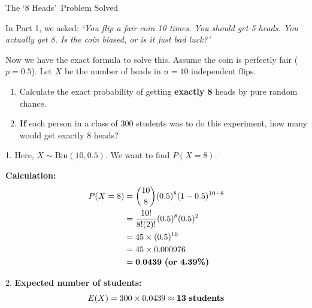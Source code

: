 \begin{frame}[allowframebreaks]{The \lq 8 Heads\rq\ Problem Solved}
    \begin{example}
        In Part 1, we asked: \textit{\lq You flip a fair coin 10 times. You should get 5 heads. You actually get 8. Is the coin biased, or is it just bad luck?\rq}
        
        Now we have the exact formula to solve this. Assume the coin is perfectly fair ($p = 0.5$). Let $X$ be the number of heads in $n=10$ independent flips.
        
        \vspace{0.2cm}
        \begin{enumerate}
            \item Calculate the exact probability of getting \textbf{exactly 8} heads by pure random chance.
            \item \textbf{If} each person in a class of 300 students was to do this experiment, how many would get exactly 8 heads?
        \end{enumerate}
    \end{example}

    \framebreak

    \begin{solution}
        1. Here, $X \sim \text{Bin}(10, 0.5)$. We want to find $P(X=8)$.
        
        \vspace{0.2cm}
        \textbf{Calculation:}
        \begin{align*}
            P(X=8) &= \binom{10}{8} (0.5)^8 (1 - 0.5)^{10-8} \\
                   &= \frac{10!}{8!(2)!} (0.5)^8 (0.5)^2 \\
                   &= 45 \times (0.5)^{10} \\
                   &= 45 \times 0.000976 \\
                   &= \mathbf{0.0439} \text{ \textbf{(or 4.39\%)}}
        \end{align*}
        
        \vspace{0.3cm}
        2. \textbf{Expected number of students:} 
        \[ E(X) = 300 \times 0.0439 \approx \mathbf{13} \text{ \textbf{students}} \]
    \end{solution}
    
    \framebreak
    

\end{frame}
